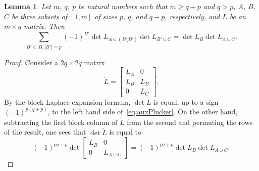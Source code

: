 \documentclass{amsart}
\newtheorem{lemma}[theorem]{Lemma}
\theoremstyle{definition}
\theoremstyle{remark}
\numberwithin{equation}{section}
\numberwithin{theorem}{section}
\begin{document}
\begin{lemma}
\label{auxPlucker}
Let $m$, $q$, $p$ be natural numbers such that $m\geq q+p$ and $q>p$, $A$, $B$, $C$ be three subsets of $[1,m]$ of sizes $p$, $q$, and $q-p$, respectively, and $L$ be an $m\times q$ matrix.  Then
\begin{equation}
\label{eq:auxPlucker}
\sum_{B'\subset B, |B'|=p} (-1)^{B'} \det L_{A\cup (B\setminus B')} \det L_{B'\cup C} = \det L_B  \det L_{A\cup C} .
\end{equation}
\end{lemma}

\begin{proof} Consider a $2q\times 2q$ matrix 
\[
\tilde{L} = \begin{bmatrix} L_A & 0\\ L_B & L_B\\ 0 & L_C\end{bmatrix}.
\]
By the block Laplace expansion formula, $\det \tilde{L}$ is equal, up to a sign $(-1)^{p(q+p)}$, to the left hand side of~\eqref{eq:auxPlucker}. On the other hand, subtracting the first block column of $\tilde{L}$ from the second and permuting the rows of the result, one sees that $\det \tilde{L}$ is equal to
\[
(-1)^{pq+p}\det \begin{bmatrix} L_B & 0\\ 0 & L_{A\cup C}\end{bmatrix}= (-1)^{pq+p}\det L_B  \det L_{A\cup C}.
\]
\end{proof}
\end{document}
